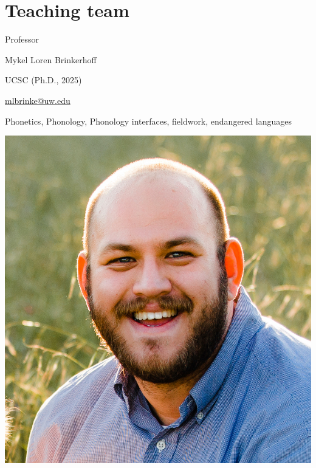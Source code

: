 \documentclass{beamer}
\begin{document}
\section{Teaching team}
\begin{frame}{Professor}
    \begin{multicols}{2}
        \begin{description}[font=\bfseries]
            \item[Name:] Mykel Loren Brinkerhoff
            \item[Education:] UCSC (Ph.D., 2025)
            \item[Contact:] \href{mailto:mlbrinke@uw.edu}{mlbrinke@uw.edu}
            \item[Research Interests:] Phonetics, Phonology, Phonology interfaces, fieldwork, endangered languages
        \end{description}
        \columnbreak
        \begin{center}
            \includegraphics[width=0.9\linewidth]{figs/Brinkerhoff.jpeg} %
        \end{center}
    \end{multicols}
\end{frame}
\end{document}
